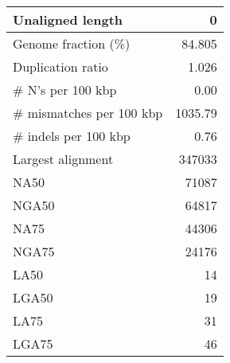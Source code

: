 \documentclass[12pt,a4paper]{article}
\begin{document}
\begin{table}[ht]
\begin{center}
\begin{tabular}{|l*{1}{|r}|}
Unaligned length & 0 \\ \hline
Genome fraction (\%) & 84.805 \\ \hline
Duplication ratio & 1.026 \\ \hline
\# N's per 100 kbp & 0.00 \\ \hline
\# mismatches per 100 kbp & 1035.79 \\ \hline
\# indels per 100 kbp & 0.76 \\ \hline
Largest alignment & 347033 \\ \hline
NA50 & 71087 \\ \hline
NGA50 & 64817 \\ \hline
NA75 & 44306 \\ \hline
NGA75 & 24176 \\ \hline
LA50 & 14 \\ \hline
LGA50 & 19 \\ \hline
LA75 & 31 \\ \hline
LGA75 & 46 \\ \hline
\end{tabular}
\end{center}
\end{table}
\end{document}
